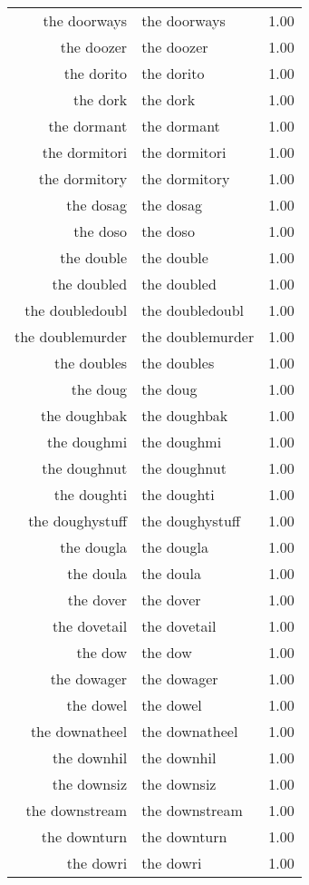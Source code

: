 \begin{table}[ht]
\begin{tabular}{rlr}
  the doorways & the doorways & 1.00 \\ 
  the doozer & the doozer & 1.00 \\ 
  the dorito & the dorito & 1.00 \\ 
  the dork & the dork & 1.00 \\ 
  the dormant & the dormant & 1.00 \\ 
  the dormitori & the dormitori & 1.00 \\ 
  the dormitory & the dormitory & 1.00 \\ 
  the dosag & the dosag & 1.00 \\ 
  the doso & the doso & 1.00 \\ 
  the double & the double & 1.00 \\ 
  the doubled & the doubled & 1.00 \\ 
  the doubledoubl & the doubledoubl & 1.00 \\ 
  the doublemurder & the doublemurder & 1.00 \\ 
  the doubles & the doubles & 1.00 \\ 
  the doug & the doug & 1.00 \\ 
  the doughbak & the doughbak & 1.00 \\ 
  the doughmi & the doughmi & 1.00 \\ 
  the doughnut & the doughnut & 1.00 \\ 
  the doughti & the doughti & 1.00 \\ 
  the doughystuff & the doughystuff & 1.00 \\ 
  the dougla & the dougla & 1.00 \\ 
  the doula & the doula & 1.00 \\ 
  the dover & the dover & 1.00 \\ 
  the dovetail & the dovetail & 1.00 \\ 
  the dow & the dow & 1.00 \\ 
  the dowager & the dowager & 1.00 \\ 
  the dowel & the dowel & 1.00 \\ 
  the downatheel & the downatheel & 1.00 \\ 
  the downhil & the downhil & 1.00 \\ 
  the downsiz & the downsiz & 1.00 \\ 
  the downstream & the downstream & 1.00 \\ 
  the downturn & the downturn & 1.00 \\ 
  the dowri & the dowri & 1.00 \\ 

\end{tabular}
\end{table}
